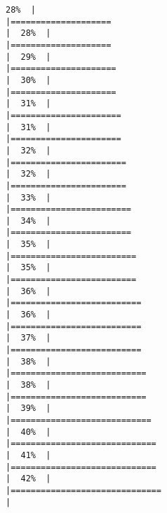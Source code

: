 \documentclass[
]{book}
\begin{document}
\begin{verbatim}
28%  |                                                                              |====================                                                  |  28%  |                                                                              |====================                                                  |  29%  |                                                                              |=====================                                                 |  30%  |                                                                              |=====================                                                 |  31%  |                                                                              |======================                                                |  31%  |                                                                              |======================                                                |  32%  |                                                                              |=======================                                               |  32%  |                                                                              |=======================                                               |  33%  |                                                                              |========================                                              |  34%  |                                                                              |========================                                              |  35%  |                                                                              |=========================                                             |  35%  |                                                                              |=========================                                             |  36%  |                                                                              |==========================                                            |  36%  |                                                                              |==========================                                            |  37%  |                                                                              |==========================                                            |  38%  |                                                                              |===========================                                           |  38%  |                                                                              |===========================                                           |  39%  |                                                                              |============================                                          |  40%  |                                                                              |=============================                                         |  41%  |                                                                              |=============================                                         |  42%  |                                                                              |==============================                                        |  
\end{verbatim}
\end{document}
